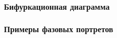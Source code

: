 \documentclass[slidestop,compress,mathserif]{beamer}
\begin{document}
\begin{frame}
\frametitle{Бифуркационная диаграмма}
\begin{figure}[h!]
\end{figure}
\end{frame}
\begin{frame}
\frametitle{Примеры фазовых портретов}
\begin{figure}[h!]
\vspace{-1em}
\vspace{-2em}
\end{figure}
\end{frame}
\end{document}
